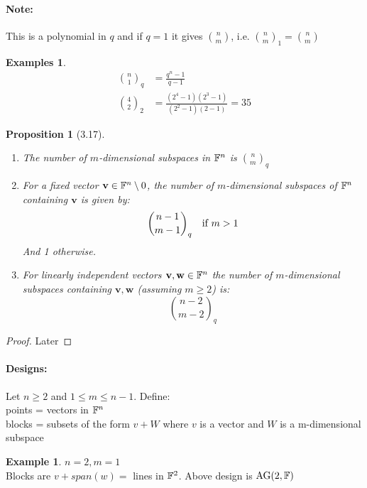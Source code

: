 \documentclass[]{article}
\newtheorem{prop}[thm]{Proposition}
\theoremstyle{definition}
\newtheorem*{exmp}{Example}
\newtheorem*{exmps}{Examples}
\theoremstyle{remark}
\numberwithin{equation}{section}
\begin{document}
			\paragraph*{Note:} This is a polynomial in $q$ and if $q = 1$ it gives $\binom{n}{m}$, i.e. $\binom{n}{m}_1 = \binom{n}{m} $

			\begin{exmps}
				\begin{align*}
					\binom{n}{1}_q &= \frac{q^n -1}{q-1}\\
					\binom{4}{2}_2 &= \frac{(2^4 - 1)(2^3 - 1)}{(2^2-1)(2-1)} = 35
				\end{align*}
			\end{exmps}

			\begin{prop}[3.17]\hfill\\
				\begin{enumerate}
					\item The number of $m$-dimensional subspaces in $\mathbb F^n$ is $\binom{n}{m}_q$
					\item For a fixed vector $\mathbf{v} \in \mathbb F^n\setminus 0$, the number of $m$-dimensional subspaces of $\mathbb F^n$ containing $\mathbf{v}$ is given by:
					\[
						\binom{n-1}{m-1}_q \quad \text{if $m>1$}\\
					\]
					And 1 otherwise.

					\item For linearly independent vectors $\mathbf{v,w} \in \mathbb F^n$ the number of $m$-dimensional subspaces containing $\mathbf{v,w}$ (assuming $m\geq 2$) is:
					\[
						\binom{n-2}{m-2}_q
					\]
				\end{enumerate}
			\end{prop}
			\begin{proof}
				Later
			\end{proof}

			\paragraph*{Designs:} Let $n \geq 2$ and $1 \leq m \leq n-1$. Define:
				\\
				points \quad = \quad vectors in $\mathbb F^n$\\
				blocks \quad = \quad subsets of the form $v + W$ where $v$ is a vector and $W$ is a m-dimensional subspace

			\begin{exmp}
				$n = 2, m = 1$\\
				Blocks are $v + span(w) =$ lines in $\mathbb F^2$. Above design is $\text{AG}(2,\mathbb F)$
			\end{exmp}
\end{document}
